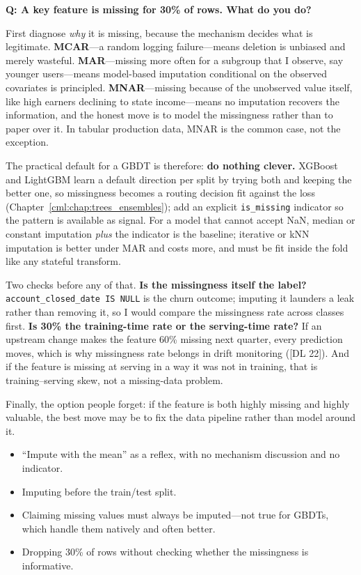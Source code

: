 \begin{interviewq}
\textbf{Q: A key feature is missing for 30\% of rows. What do you do?}

 \quad {} \quad \badgefreq{\freqmed}

\stronganswer

First diagnose \emph{why} it is missing, because the mechanism decides what is legitimate. \textbf{MCAR}---a random logging failure---means deletion is unbiased and merely wasteful. \textbf{MAR}---missing more often for a subgroup that I observe, say younger users---means model-based imputation conditional on the observed covariates is principled. \textbf{MNAR}---missing because of the unobserved value itself, like high earners declining to state income---means no imputation recovers the information, and the honest move is to model the missingness rather than to paper over it. In tabular production data, MNAR is the common case, not the exception.

The practical default for a GBDT is therefore: \textbf{do nothing clever.} XGBoost and LightGBM learn a default direction per split by trying both and keeping the better one, so missingness becomes a routing decision fit against the loss (Chapter~\ref{cml:chap:trees_ensembles}); add an explicit \texttt{is\_missing} indicator so the pattern is available as signal. For a model that cannot accept NaN, median or constant imputation \emph{plus} the indicator is the baseline; iterative or kNN imputation is better under MAR and costs more, and must be fit inside the fold like any stateful transform.

Two checks before any of that. \textbf{Is the missingness itself the label?} \texttt{account\_closed\_date IS NULL} is the churn outcome; imputing it launders a leak rather than removing it, so I would compare the missingness rate across classes first. \textbf{Is 30\% the training-time rate or the serving-time rate?} If an upstream change makes the feature 60\% missing next quarter, every prediction moves, which is why missingness rate belongs in drift monitoring ([DL 22]). And if the feature is missing at serving in a way it was not in training, that is training--serving skew, not a missing-data problem.

Finally, the option people forget: if the feature is both highly missing and highly valuable, the best move may be to fix the data pipeline rather than model around it.

\redflags
\begin{itemize}
    \item ``Impute with the mean'' as a reflex, with no mechanism discussion and no indicator.
    \item Imputing before the train/test split.
    \item Claiming missing values must always be imputed---not true for GBDTs, which handle them natively and often better.
    \item Dropping 30\% of rows without checking whether the missingness is informative.
\end{itemize}


\end{interviewq}

